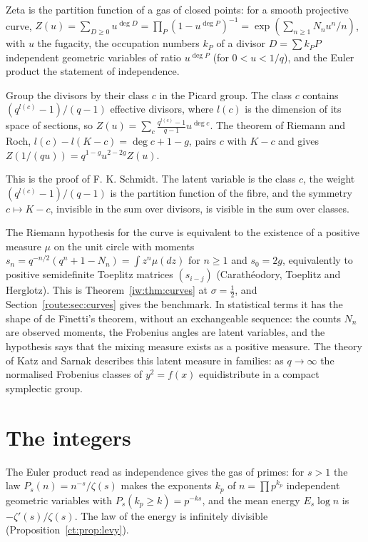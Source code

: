 Zeta is the partition function of a gas of closed points: for a smooth projective curve, $Z(u)=\sum_{D\ge0}u^{\deg D}=\prod_P(1-u^{\deg P})^{-1}=\exp(\sum_{n\ge1}N_nu^n/n)$, with $u$ the fugacity, the occupation numbers $k_P$ of a divisor $D=\sum k_PP$ independent geometric variables of ratio $u^{\deg P}$ (for $0<u<1/q$), and the Euler product the statement of independence.

\begin{proposition}\label{lvz:prop:schmidt}
Group the divisors by their class $c$ in the Picard group. The class $c$ contains $(q^{l(c)}-1)/(q-1)$ effective divisors, where $l(c)$ is the dimension of its space of sections, so $Z(u)=\sum_c\frac{q^{l(c)}-1}{q-1}u^{\deg c}$. The theorem of Riemann and Roch, $l(c)-l(K-c)=\deg c+1-g$, pairs $c$ with $K-c$ and gives $Z(1/(qu))=q^{1-g}u^{2-2g}Z(u)$.
\end{proposition}

This is the proof of F. K. Schmidt. The latent variable is the class $c$, the weight $(q^{l(c)}-1)/(q-1)$ is the partition function of the fibre, and the symmetry $c\mapsto K-c$, invisible in the sum over divisors, is visible in the sum over classes.

The Riemann hypothesis for the curve is equivalent to the existence of a positive measure $\mu$ on the unit circle with moments $s_n=q^{-n/2}(q^n+1-N_n)=\int z^n\mu(dz)$ for $n\ge1$ and $s_0=2g$, equivalently to positive semidefinite Toeplitz matrices $(s_{i-j})$ (Carath\'eodory, Toeplitz and Herglotz). This is Theorem~\ref{iw:thm:curves} at $\sigma=\frac12$, and Section~\ref{route:sec:curves} gives the benchmark. In statistical terms it has the shape of de Finetti's theorem, without an exchangeable sequence: the counts $N_n$ are observed moments, the Frobenius angles are latent variables, and the hypothesis says that the mixing measure exists as a positive measure. The theory of Katz and Sarnak \cite{KatzSarnak99} describes this latent measure in families: as $q\to\infty$ the normalised Frobenius classes of $y^2=f(x)$ equidistribute in a compact symplectic group.

\section{The integers}\label{lvz:sec:int}

The Euler product read as independence gives the gas of primes: for $s>1$ the law $P_s(n)=n^{-s}/\zeta(s)$ makes the exponents $k_p$ of $n=\prod p^{k_p}$ independent geometric variables with $P_s(k_p\ge k)=p^{-ks}$, and the mean energy $E_s\log n$ is $-\zeta'(s)/\zeta(s)$. The law of the energy is infinitely divisible (Proposition~\ref{ct:prop:levy}).

